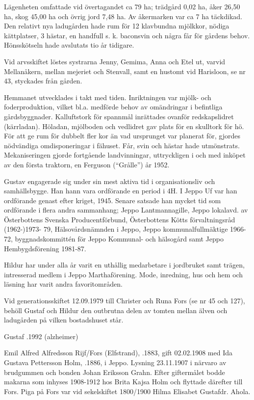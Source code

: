 Lägenheten omfattade vid övertagandet ca 79 ha; trädgård 0,02 ha, åker 26,50 ha, skog 45,00 ha och övrig jord 7,48 ha. Av åkermarken var ca 7 ha täckdikad. Den relativt nya ladugården hade rum för 12 klavbundna mjölkkor, nödiga kättplatser, 3 hästar, en handfull s. k. baconsvin och några får för gårdens behov. Hönsskötseln hade avslutats tio år tidigare.

Vid arvsskiftet löstes systrarna Jenny, Gemima, Anna och Etel ut, varvid Mellanåkern, mellan mejeriet och Stenvall, samt en hustomt vid Harisloon, se nr 43, styckades från gården.

Hemmanet utvecklades i takt med tiden. Inriktningen var mjölk- och foderproduktion, vilket bl.a. medförde behov av omändringar i befintliga gårdsbyggnader. Kalluftstork för spannmål inrättades ovanför redskapslidret (kärrladan). Höladan, mjölboden och vedlidret gav plats för en skulltork för hö. För att ge rum för dubbelt fler kor än vad ursprunget var planerat för, gjordes nödvändiga omdisponeringar i fähuset. Får, svin och hästar hade utmönstrats. Mekaniseringen gjorde fortgående landvinningar, uttryckligen i och med inköpet av den första traktorn, en Ferguson (``Grålle'') år 1952.

Gustav engagerade sig under sin mest aktiva tid i organisationsliv och 	samhällsbygge. Han hann vara ordförande en period i 4H. I Jeppo Uf 	var han ordförande genast efter kriget, 1945. Senare satsade han mycket tid som ordförande i flera andra sammanhang; Jeppo Lantmannagille, Jeppo lokalavd. av Österbottens Svenska Producentförbund, Österbottens Kötts förvaltningsråd (1962-)1973-	79, Hälsovårdsnämnden i Jeppo, Jeppo kommunalfullmäktige 1966-72, byggnadskommittén för Jeppo Kommunal- och hälsogård samt Jeppo Hembygdsförening 1981-87.

Hildur har under alla år varit en uthållig medarbetare i jordbruket	samt trägen, intresserad medlem i Jeppo Marthaförening. Mode,	inredning, hus och hem och läsning har varit andra favoritområden.

Vid generationsskiftet 12.09.1979 till Christer och Runa Fors (se nr 45 och 127), behöll Gustaf och Hildur den outbrutna delen av tomten 	mellan älven och ladugården på vilken bostadshuset står.

Gustaf .1992 (alzheimer)



Emil Alfred Alfredsson Rijf/Fors (Elfstrand), .1883, gift 02.02.1908 med Ida Gustava Pettersson Holm, .1886, i Jeppo. Lysning 23.11.1907 i närvaro av brudgummen och bonden Johan Eriksson Grahn. Efter giftermålet bodde makarna som inhyses 1908-1912 hos Brita Kajsa Holm och flyttade därefter till Fors. Piga på Fors var vid sekelskiftet 1800/1900 Hilma Elisabet Gustafdr. Ahola.


